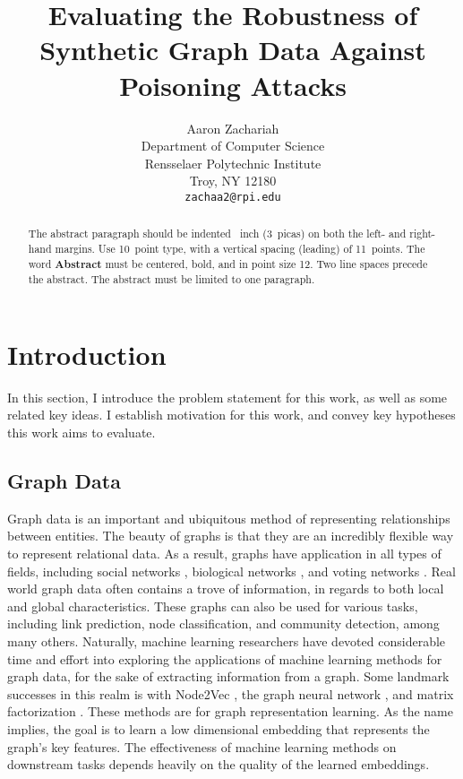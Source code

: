 \documentclass{article}
\title{Evaluating the Robustness of Synthetic Graph Data Against Poisoning Attacks}
\author{
  Aaron Zachariah \\
  Department of Computer Science\\
  Rensselaer Polytechnic Institute\\
  Troy, NY 12180 \\
  \texttt{zachaa2@rpi.edu} \\
}
\begin{document}
\maketitle


\begin{abstract}
  The abstract paragraph should be indented ~inch (3~picas) on
  both the left- and right-hand margins. Use 10~point type, with a vertical
  spacing (leading) of 11~points.  The word \textbf{Abstract} must be centered,
  bold, and in point size 12. Two line spaces precede the abstract. The abstract
  must be limited to one paragraph.
\end{abstract}


\section{Introduction}
\label{Intro}

In this section, I introduce the problem statement for this work, as well as some related key ideas. I establish motivation for this work, and convey key hypotheses this work aims to evaluate. 

\subsection{Graph Data}

Graph data is an important and ubiquitous method of representing relationships between entities. The beauty of graphs is that they are an incredibly flexible way to represent relational data. As a result, graphs have application in all types of fields, including social networks \cite{socialnetworks}, biological networks \cite{Girvan_2002}, and voting networks \cite{votingnetworks}. Real world graph data often contains a trove of information, in regards to both local and global characteristics. These graphs can also be used for various tasks, including link prediction, node classification, and community detection, among many others. Naturally, machine learning researchers have devoted considerable time and effort into exploring the applications of machine learning methods for graph data, for the sake of extracting information from a graph. Some landmark successes in this realm is with Node2Vec \cite{grover2016node2vec}, the graph neural network \cite{GNNModel}, and matrix factorization \cite{matrixfactor}. These methods are for graph representation learning. As the name implies, the goal is to learn a low dimensional embedding that represents the graph's key features. The effectiveness of machine learning methods on downstream tasks depends heavily on the quality of the learned embeddings. 
\end{document}

